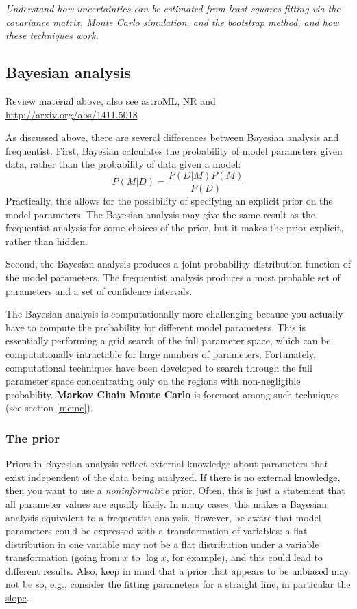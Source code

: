 \documentclass{article}
\newcommand{\test}[1]{%
    \begin{center}
        \colorbox{hl}{\parbox{0.9\textwidth}{\emph{\centering #1}}}
    \end{center}}
\begin{document}
\test{Understand how uncertainties can be estimated from least-squares
fitting via the covariance matrix, Monte Carlo simulation, and the
bootstrap method, and how these techniques work.}

\subsection{Bayesian analysis}
Review material above, also see astroML, NR and
\url{http://arxiv.org/abs/1411.5018}

As discussed above, there are several differences between Bayesian analysis
and frequentist. First, Bayesian calculates the probability of model
parameters given data, rather than the probability of data given a model:
$$ {P(M|D)} = \frac{P(D|M)P(M)}{P(D)} $$
Practically, this allows for the possibility of specifying an explicit
prior on the model parameters. The Bayesian analysis may give the same
result as the frequentist analysis for some choices of the prior, but
it makes the prior explicit, rather than hidden.

Second, the Bayesian analysis produces a joint probability
distribution function of the model parameters. The frequentist
analysis produces a most probable set of parameters and a set of
confidence intervals.

The Bayesian analysis is computationally more challenging because you
actually have to compute the probability for different model
parameters. This is essentially performing a grid search of the full
parameter space, which can be computationally intractable for large
numbers of parameters. Fortunately, computational techniques have been
developed to search through the full parameter space concentrating
only on the regions with non-negligible probability.
\textbf{Markov Chain Monte Carlo} is foremost among such techniques
(see section \ref{mcmc}).

\subsubsection{The prior}
Priors in Bayesian analysis reflect external knowledge about parameters that
exist independent of the data being analyzed. If there is no external
knowledge, then you want to use a \emph{noninformative} prior.  Often, this is
just a statement that all parameter values are equally likely.  In many cases,
this makes a Bayesian analysis equivalent to a frequentist analysis. However,
be aware that model parameters could be expressed with a transformation of
variables: a flat distribution in one variable may not be a flat distribution
under a variable transformation (going from $x$ to $\log{x}$, for example), and
this could lead to different results. Also, keep in mind that a prior that
appears to be unbiased may not be so, e.g., consider the fitting parameters for
a straight line, in particular the
\href{http://astronomy.nmsu.edu/holtz/a575/images/slope.png} {slope}.
\end{document}
